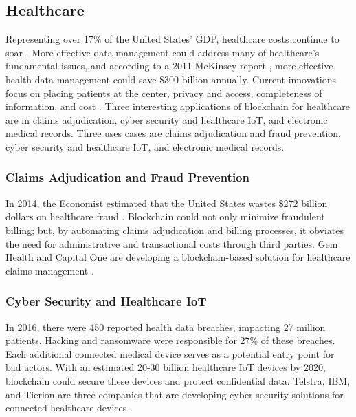 \documentclass[sigconf]{acmart}
\begin{document}
\subsection{Healthcare}
Representing over 17\% of the United States' GDP, healthcare costs continue to soar \cite{hitchingHealthcare}. More effective data management could address many of healthcare's fundamental issues, and according to a 2011 McKinsey report \cite{mckinsey2011}, more effective health data management could save \$300 billion annually. Current innovations focus on placing patients at the center, privacy and access, completeness of information, and cost \cite{hitchingHealthcare}. Three interesting applications of blockchain for healthcare are in claims adjudication, cyber security and healthcare IoT, and electronic medical records. Three uses cases are claims adjudication and fraud prevention, cyber security and healthcare IoT, and electronic medical records.

\subsubsection{Claims Adjudication and Fraud Prevention}
In 2014, the Economist estimated that the United States wastes \$272 billion dollars on healthcare fraud \cite{economist2014}. Blockchain could not only minimize fraudulent billing; but, by automating claims adjudication and billing processes, it obviates the need for administrative and transactional costs through third parties. Gem Health and Capital One are developing a blockchain-based solution for healthcare claims management \cite{das2017}.

\subsubsection{Cyber Security and Healthcare IoT}
In 2016, there were 450 reported health data breaches, impacting 27 million patients. Hacking and ransomware were responsible for 27\% of these breaches. Each additional connected medical device serves as a potential entry point for bad actors. With an estimated 20-30 billion healthcare IoT devices by 2020, blockchain could secure these devices and protect confidential data. Telstra, IBM, and Tierion are three companies that are developing cyber security solutions for connected healthcare devices \cite{das2017}.
\end{document}
